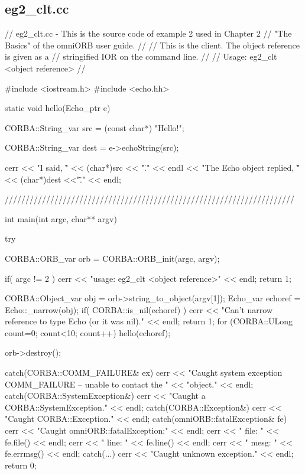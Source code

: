 \documentclass[11pt,twoside,a4paper]{book}
\begin{document}
\clearpage
\subsection{eg2\_clt.cc}

\begin{cxxlisting}
// eg2_clt.cc - This is the source code of example 2 used in Chapter 2
//              "The Basics" of the omniORB user guide.
//
//              This is the client. The object reference is given as a
//              stringified IOR on the command line.
//
// Usage: eg2_clt <object reference>
//

#include <iostream.h>
#include <echo.hh>


static void hello(Echo_ptr e)
{
  CORBA::String_var src = (const char*) "Hello!";

  CORBA::String_var dest = e->echoString(src);

  cerr << "I said, \"" << (char*)src << "\"." << endl
       << "The Echo object replied, \"" << (char*)dest <<"\"." << endl;
}

//////////////////////////////////////////////////////////////////////

int main(int argc, char** argv)
{


  try {
    CORBA::ORB_var orb = CORBA::ORB_init(argc, argv);

    if( argc != 2 ) {
      cerr << "usage:  eg2_clt <object reference>" << endl;
      return 1;
    }

    CORBA::Object_var obj = orb->string_to_object(argv[1]);
    Echo_var echoref = Echo::_narrow(obj);
    if( CORBA::is_nil(echoref) ) {
      cerr << "Can't narrow reference to type Echo (or it was nil)." << endl;
      return 1;
    }
    for (CORBA::ULong count=0; count<10; count++) 
      hello(echoref);

    orb->destroy();
  }
  catch(CORBA::COMM_FAILURE& ex) {
    cerr << "Caught system exception COMM_FAILURE -- unable to contact the "
         << "object." << endl;
  }
  catch(CORBA::SystemException&) {
    cerr << "Caught a CORBA::SystemException." << endl;
  }
  catch(CORBA::Exception&) {
    cerr << "Caught CORBA::Exception." << endl;
  }
  catch(omniORB::fatalException& fe) {
    cerr << "Caught omniORB::fatalException:" << endl;
    cerr << "  file: " << fe.file() << endl;
    cerr << "  line: " << fe.line() << endl;
    cerr << "  mesg: " << fe.errmsg() << endl;
  }
  catch(...) {
    cerr << "Caught unknown exception." << endl;
  }
  return 0;
}
\end{cxxlisting}
\end{document}
